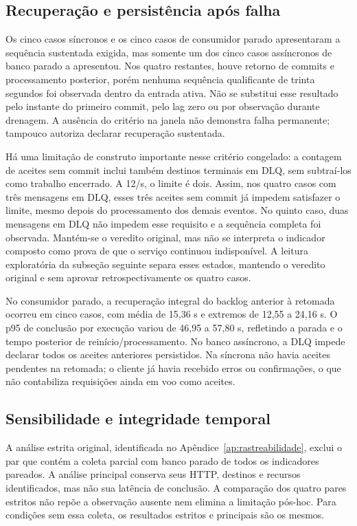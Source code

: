 \subsection{Recuperação e persistência após falha}

Os cinco casos síncronos e os cinco casos de consumidor parado apresentaram a sequência sustentada exigida, mas somente um dos cinco casos assíncronos de banco parado a apresentou. Nos quatro restantes, houve retorno de commits e processamento posterior, porém nenhuma sequência qualificante de trinta segundos foi observada dentro da entrada ativa. Não se substitui esse resultado pelo instante do primeiro commit, pelo lag zero ou por observação durante drenagem. A ausência do critério na janela não demonstra falha permanente; tampouco autoriza declarar recuperação sustentada.

Há uma limitação de construto importante nesse critério congelado: a contagem de aceites sem commit inclui também destinos terminais em DLQ, sem subtraí-los como trabalho encerrado. A 12/s, o limite é dois. Assim, nos quatro casos com três mensagens em DLQ, esses três aceites sem commit já impedem satisfazer o limite, mesmo depois do processamento dos demais eventos. No quinto caso, duas mensagens em DLQ não impedem esse requisito e a sequência completa foi observada. Mantém-se o veredito original, mas não se interpreta o indicador composto como prova de que o serviço continuou indisponível. A leitura exploratória da subseção seguinte separa esses estados, mantendo o veredito original e sem aprovar retrospectivamente os quatro casos.

No consumidor parado, a recuperação integral do backlog anterior à retomada ocorreu em cinco casos, com média de 15,36 s e extremos de 12,55 a 24,16 s. O p95 de conclusão por execução variou de 46,95 a 57,80 s, refletindo a parada e o tempo posterior de reinício/processamento. No banco assíncrono, a DLQ impede declarar todos os aceites anteriores persistidos. Na síncrona não havia aceites pendentes na retomada; o cliente já havia recebido erros ou confirmações, o que não contabiliza requisições ainda em voo como aceites.



\subsection{Sensibilidade e integridade temporal}
A análise estrita original, identificada no Apêndice~\ref{ap:rastreabilidade}, exclui o par que contém a coleta parcial com banco parado de todos os indicadores pareados. A análise principal conserva seus HTTP, destinos e recursos identificados, mas não sua latência de conclusão. A comparação dos quatro pares estritos não repõe a observação ausente nem elimina a limitação pós-hoc. Para condições sem essa coleta, os resultados estritos e principais são os mesmos.

